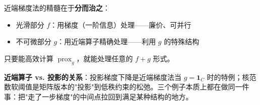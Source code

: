 \documentclass[12pt, a4paper]{ctexart}
\begin{document}
\begin{insight}[近端梯度法的核心思想]

近端梯度法的精髓在于\textbf{分而治之}：

\begin{itemize}
    \item 光滑部分 $f$：用梯度（一阶信息）处理——廉价、可并行
    \item 不可微部分 $g$：用近端算子精确处理——利用 $g$ 的特殊结构
\end{itemize}

只要能高效计算 $\operatorname{prox}_g$，就能处理任意的 $f + g$ 形式。

\textbf{近端算子 vs. 投影的关系}：投影梯度下降是近端梯度法当 $g = \mathbf{1}_C$ 时的特例；核范数软阈值是矩阵版本的"投影"到低秩约束的松弛。三个例子本质上都在做同一件事：把"走了一步梯度"的中间点拉回到满足某种结构的地方。

\end{insight}
\end{document}
